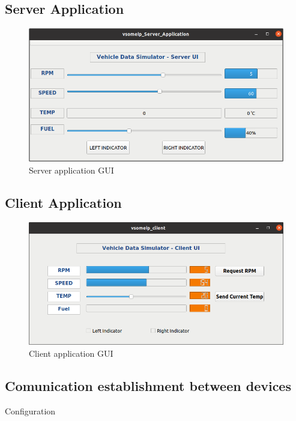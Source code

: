 \subsection{Server Application}
\begin{figure}[!htb]
	\centering
		\includegraphics[width=1\textwidth]{images/serverUI.png}
	\caption{Server application GUI}
	\label{fig:serverUI}
\end{figure}

\subsection{Client Application}
\begin{figure}[!htb]
	\centering
		\includegraphics[width=1\textwidth]{images/clientUI.png}
	\caption{Client application GUI}
	\label{fig:clientUI}
\end{figure}
\subsection{Comunication establishment between devices}
Configuration
